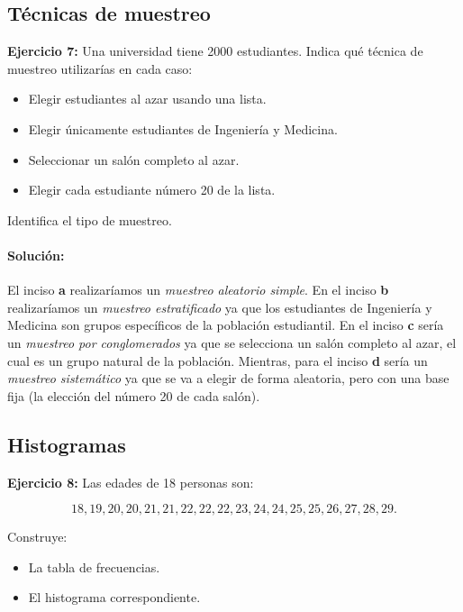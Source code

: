 \documentclass[12pt]{article}
\begin{document}
\subsection*{\centering Técnicas de muestreo}
\textbf{Ejercicio 7:} Una universidad tiene 2000 estudiantes. Indica qué técnica de muestreo utilizarías en cada caso:
\begin{itemize}
    \item [a.] Elegir estudiantes al azar usando una lista.
    \item [b.] Elegir únicamente estudiantes de Ingeniería y Medicina.
    \item [c.] Seleccionar un salón completo al azar.
    \item [d.] Elegir cada estudiante número 20 de la lista.
\end{itemize}

Identifica el tipo de muestreo.

\paragraph{\textbf{Solución: }}

El inciso \textbf{a} realizaríamos un \textit{muestreo aleatorio simple}. En el inciso \textbf{b} realizaríamos un \textit{muestreo estratificado} ya que los estudiantes de Ingeniería y Medicina son grupos específicos de la población estudiantil. En el inciso \textbf{c} sería un \textit{muestreo por conglomerados} ya que se selecciona un salón completo al azar, el cual es un grupo natural de la población. Mientras, para el inciso \textbf{d} sería un \textit{muestreo sistemático} ya que se va a elegir de forma aleatoria, pero con una base fija (la elección del número 20 de cada salón).

\subsection*{\centering Histogramas}
\textbf{Ejercicio 8:} Las edades de 18 personas son:

\[18, 19, 20, 20, 21, 21, 22, 22, 22, 23, 24, 24, 25, 25, 26, 27, 28, 29.\]

Construye:
\begin{itemize}
    \item La tabla de frecuencias.
    \item El histograma correspondiente.
\end{itemize}
\end{document}
